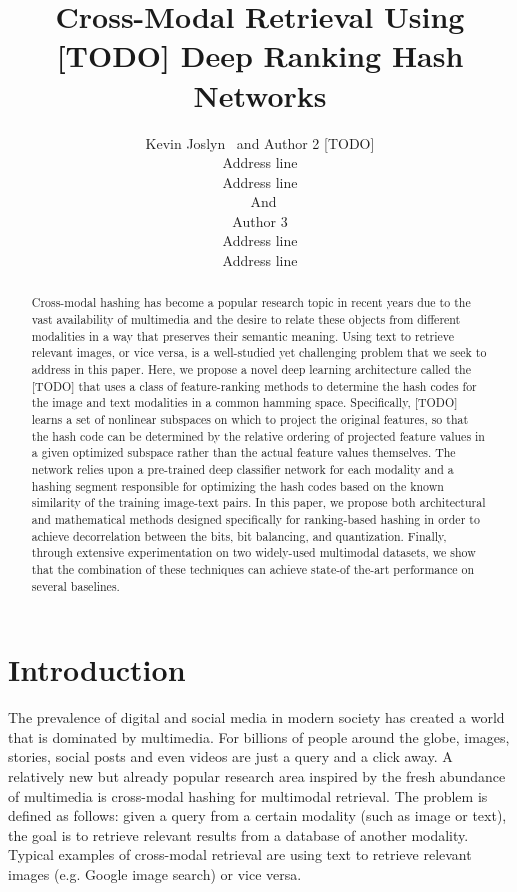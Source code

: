 \documentclass[letterpaper]{article}
\begin{document}
\title{Cross-Modal Retrieval Using [TODO] Deep Ranking Hash Networks}
\author{Kevin Joslyn \ and Author 2 [TODO]\\
Address line\\
Address line\\
\ And\\
Author 3\\
Address line\\
Address line
}
%

\maketitle

\begin{abstract}
	
Cross-modal hashing has become a popular research topic in recent years due to the vast availability of multimedia and the desire to relate these objects from different modalities in a way that preserves their semantic meaning. Using text to retrieve relevant images, or vice versa, is a well-studied yet challenging problem that we seek to address in this paper. Here, we propose a novel deep learning architecture called the [TODO] that uses a class of feature-ranking methods to determine the hash codes for the image and text modalities in a common hamming space. Specifically, [TODO] learns a set of nonlinear subspaces on which to project the original features, so that the hash code can be determined by the relative ordering of projected feature values in a given optimized subspace rather than the actual feature values themselves.  The network relies upon a pre-trained deep classifier network for each modality and a hashing segment responsible for optimizing the hash codes based on the known similarity of the training image-text pairs. In this paper, we propose both architectural and mathematical methods designed specifically for ranking-based hashing in order to achieve decorrelation between the bits, bit balancing, and quantization. Finally, through extensive experimentation on two widely-used multimodal datasets, we show that the combination of these techniques can achieve state-of the-art performance on several baselines.
	
\end{abstract}

\section{Introduction}

The prevalence of digital and social media in modern society has created a world that is dominated by multimedia. For billions of people around the globe, images, stories, social posts and even videos are just a query and a click away. A relatively new but already popular research area inspired by the fresh abundance of multimedia is cross-modal hashing for multimodal retrieval. The problem is defined as follows: given a query from a certain modality (such as image or text), the goal is to retrieve relevant results from a database of another modality. Typical examples of cross-modal retrieval are using text to retrieve relevant images (e.g. Google image search) or vice versa.
\end{document}
